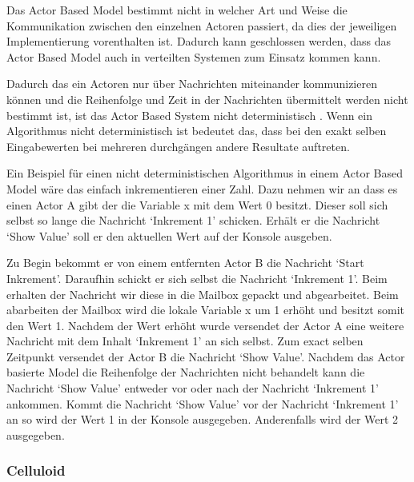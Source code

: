 Das Actor Based Model bestimmt nicht in welcher Art und Weise die Kommunikation zwischen den einzelnen Actoren passiert, da dies der jeweiligen Implementierung vorenthalten ist. Dadurch kann geschlossen werden, dass das Actor Based Model auch in verteilten Systemen zum Einsatz kommen kann.

Dadurch das ein Actoren nur über Nachrichten miteinander kommunizieren können und die Reihenfolge und Zeit in der Nachrichten übermittelt werden nicht bestimmt ist, ist das Actor Based System nicht deterministisch \cite[]{Agh85}. Wenn ein Algorithmus nicht deterministisch ist bedeutet das, dass bei den exakt selben Eingabewerten bei mehreren durchgängen andere Resultate auftreten.

Ein Beispiel für einen nicht deterministischen Algorithmus in einem Actor Based Model wäre das einfach inkrementieren einer Zahl. Dazu nehmen wir an dass es einen Actor A gibt der die Variable x mit dem Wert 0 besitzt. Dieser soll sich selbst so lange die Nachricht `Inkrement 1' schicken. Erhält er die Nachricht `Show Value' soll er den aktuellen Wert auf der Konsole ausgeben.

Zu Begin bekommt er von einem entfernten Actor B die Nachricht `Start Inkrement'. Daraufhin schickt er sich selbst die Nachricht `Inkrement 1'. Beim erhalten der Nachricht wir diese in die Mailbox gepackt und abgearbeitet. Beim abarbeiten der Mailbox wird die lokale Variable x um 1 erhöht und besitzt somit den Wert 1. Nachdem der Wert erhöht wurde versendet der Actor A eine weitere Nachricht mit dem Inhalt `Inkrement 1' an sich selbst. Zum exact selben Zeitpunkt versendet der Actor B die Nachricht `Show Value'. Nachdem das Actor basierte Model die Reihenfolge der Nachrichten nicht behandelt kann die Nachricht `Show Value' entweder vor oder nach der Nachricht `Inkrement 1' ankommen. Kommt die Nachricht `Show Value' vor der Nachricht `Inkrement 1' an so wird der Wert 1 in der Konsole ausgegeben. Anderenfalls wird der Wert 2 ausgegeben.

\subsubsection{Celluloid}